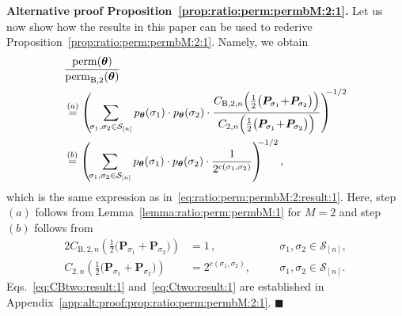 \documentclass[journal,lettersize,twocolumn]{IEEEtran} %
\renewcommand\qedsymbol{$\blacksquare$}
\newcommand{\epropositionproof}{\hfill\qedsymbol}
\newcommand{\set}[1]{\mathcal{#1}}
\newcommand{\matr}[1]{ \bm{#1} }
\newcommand{\perm}{ \mathrm{perm} }
\newcommand{\permbM}[1]{\perm_{ \mathrm{B}, #1 }}
\newcommand{\pmtheta}{p_{\mtheta}}
\newcommand{\setS}{\set{S}}
\newcommand{\Ctwo}[1]{\Cgen{2}{#1}}
\newcommand{\Cgen}[2]{C_{#1,#2}}
\newcommand{\CBtwo}[1]{\CBgen{2}{#1}}
\newcommand{\CBgen}[2]{C_{\mathrm{B},#1,#2}}
\newcommand{\mtheta}{\matr{\theta}}
\newcommand{\mP}{\matr{P}}
\begin{document}
\noindent
\textbf{Alternative proof Proposition~\ref{prop:ratio:perm:permbM:2:1}.} 
Let us now show how the results in this paper can be used to rederive
Proposition~\ref{prop:ratio:perm:permbM:2:1}. Namely, we obtain
\begin{align*}
  &
  \frac{\perm(\mtheta)}
       {\permbM{2}(\mtheta)} \nonumber \\
    &\overset{(a)}{=}
       \left( \!
         \sum_{ \sigma_1, \sigma_2 \in \setS_{[n]} }
           \pmtheta(\sigma_1)
           \cdot
           \pmtheta(\sigma_2)
           \cdot
           \frac{\CBtwo{n}\Bigl( 
                            \frac{1}{2} 
                            \bigl( 
                              \mP_{\sigma_1} \! + \! \mP_{\sigma_2}
                            \bigr)
                          \Bigr)}
                {\Ctwo{n}\Bigl( 
                           \frac{1}{2} 
                           \bigl( 
                             \mP_{\sigma_1} \! + \! \mP_{\sigma_2}
                           \bigr)
                         \Bigr)}
       \right)^{\!\!\! -1/2} \\
    &\overset{(b)}{=}
       \left( \!
         \sum_{ \sigma_1, \sigma_2 \in \setS_{[n]} }
           \pmtheta(\sigma_1)
           \cdot
           \pmtheta(\sigma_2)
           \cdot
           \frac{1}
                {2^{c(\sigma_1,\sigma_2)}}
       \right)^{\!\!\! -1/2},
\end{align*}
which is the same expression as
in~\eqref{eq:ratio:perm:permbM:2:result:1}. Here, step~$(a)$ follows from
Lemma~\ref{lemma:ratio:perm:permbM:1} for $M = 2$ and step~$(b)$ follows from
\begin{alignat}{2}
  \CBtwo{n}\left( 
             \frac{1}{2} 
             \bigl( 
               \mP_{\sigma_1} \! + \! \mP_{\sigma_2} 
             \bigr)
           \right)
    &= 1 \, , 
         &&\quad \sigma_1, \sigma_2 \in \setS_{[n]},
             \label{eq:CBtwo:result:1} \\
  \Ctwo{n}\left( 
            \frac{1}{2} 
            \bigl( 
              \mP_{\sigma_1} \! + \! \mP_{\sigma_2} 
            \bigr)
          \right)
    &= 2^{c(\sigma_1,\sigma_2)},
         &&\quad \sigma_1, \sigma_2 \in \setS_{[n]}.
             \label{eq:Ctwo:result:1}
\end{alignat}
Eqs.~\eqref{eq:CBtwo:result:1} and~\eqref{eq:Ctwo:result:1} are established in
Appendix~\ref{app:alt:proof:prop:ratio:perm:permbM:2:1}.
\epropositionproof

%
%

\ifx\withclearpagecommands\x
\clearpage
\fi
\end{document}
